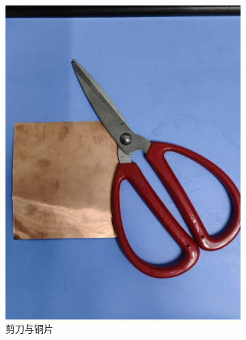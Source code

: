 \documentclass[a4paper]{report} %
\begin{document}
\begin{figure}[H]
\begin{subfigure}{0.22\textwidth}
        \includegraphics[width=\linewidth]{剪刀与铜片.jpg}
        \caption{剪刀与铜片}
    \end{subfigure}
    \begin{subfigure}{0.22\textwidth}

\end{subfigure}
\end{figure}
\end{document}
